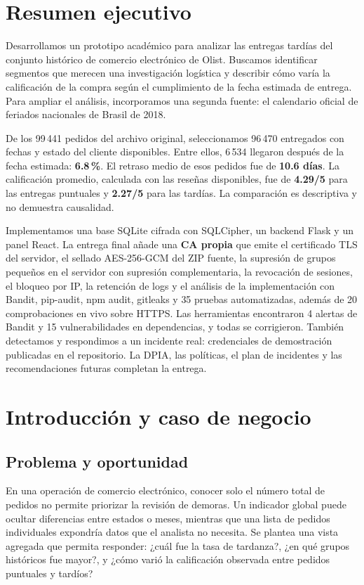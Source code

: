 \documentclass[12pt,a4paper]{article}
\begin{document}
\section{Resumen ejecutivo}
Desarrollamos un prototipo académico para analizar las entregas tardías del conjunto histórico de comercio electrónico de Olist. Buscamos identificar segmentos que merecen una investigación logística y describir cómo varía la calificación de la compra según el cumplimiento de la fecha estimada de entrega. Para ampliar el análisis, incorporamos una segunda fuente: el calendario oficial de feriados nacionales de Brasil de 2018.

De los 99\,441 pedidos del archivo original, seleccionamos 96\,470 entregados con fechas y estado del cliente disponibles. Entre ellos, 6\,534 llegaron después de la fecha estimada: \textbf{6.8\,\%}. El retraso medio de esos pedidos fue de \textbf{10.6 días}. La calificación promedio, calculada con las reseñas disponibles, fue de \textbf{4.29/5} para las entregas puntuales y \textbf{2.27/5} para las tardías. La comparación es descriptiva y no demuestra causalidad.

Implementamos una base SQLite cifrada con SQLCipher, un backend Flask y un panel React. La entrega final añade una \textbf{CA propia} que emite el certificado TLS del servidor, el sellado AES-256-GCM del ZIP fuente, la supresión de grupos pequeños en el servidor con supresión complementaria, la revocación de sesiones, el bloqueo por IP, la retención de logs y el análisis de la implementación con Bandit, pip-audit, npm audit, gitleaks y 35 pruebas automatizadas, además de 20 comprobaciones en vivo sobre HTTPS. Las herramientas encontraron 4 alertas de Bandit y 15 vulnerabilidades en dependencias, y todas se corrigieron. También detectamos y respondimos a un incidente real: credenciales de demostración publicadas en el repositorio. La DPIA, las políticas, el plan de incidentes y las recomendaciones futuras completan la entrega.

\section{Introducción y caso de negocio}
\subsection{Problema y oportunidad}
En una operación de comercio electrónico, conocer solo el número total de pedidos no permite priorizar la revisión de demoras. Un indicador global puede ocultar diferencias entre estados o meses, mientras que una lista de pedidos individuales expondría datos que el analista no necesita. Se plantea una vista agregada que permita responder: ¿cuál fue la tasa de tardanza?, ¿en qué grupos históricos fue mayor?, y ¿cómo varió la calificación observada entre pedidos puntuales y tardíos?
\end{document}
